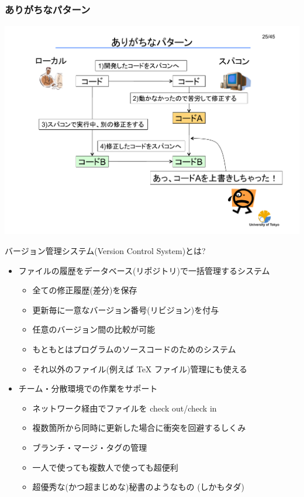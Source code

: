 \begin{frame}
  \frametitle{ありがちなパターン}
  \begin{center}
    \includegraphics[height=0.88\textheight]{pattern-1.pdf}
  \end{center}
\end{frame}

\begin{frame}[t,fragile]{バージョン管理システム(Version Control System)とは?}
  \begin{itemize}
    \setlength{\itemsep}{1em}
  \item ファイルの履歴をデータベース(リポジトリ)で一括管理するシステム
    \begin{itemize}
    \item 全ての修正履歴(差分)を保存
    \item 更新毎に一意なバージョン番号(リビジョン)を付与
    \item 任意のバージョン間の比較が可能
    \item もともとはプログラムのソースコードのためのシステム
    \item それ以外のファイル(例えば TeX ファイル)管理にも使える
    \end{itemize}
  \item チーム・分散環境での作業をサポート
    \begin{itemize}
    \item ネットワーク経由でファイルを check out/check in
    \item 複数箇所から同時に更新した場合に衝突を回避するしくみ
    \item ブランチ・マージ・タグの管理
    \item 一人で使っても複数人で使っても超便利
    \item 超優秀な(かつ超まじめな)秘書のようなもの (しかもタダ)
    \end{itemize}
  \end{itemize}
\end{frame}


